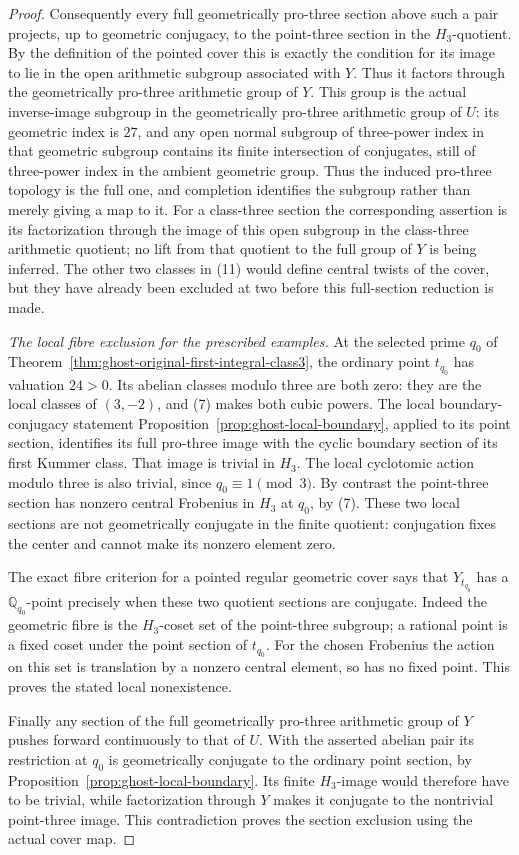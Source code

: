 \begin{proof}
Consequently every full geometrically pro-three
section above such a pair projects, up to geometric
conjugacy, to the point-three section in the
\(H_3\)-quotient. By the definition of the pointed
cover this is exactly the condition for its image
to lie in the open arithmetic subgroup associated
with \(Y\). Thus it factors through the
geometrically pro-three arithmetic group of \(Y\).
This group is the actual inverse-image subgroup in
the geometrically pro-three arithmetic group of
\(U\): its geometric index is \(27\), and any
open normal subgroup of three-power index in that
geometric subgroup contains its finite intersection
of conjugates, still of three-power index in the
ambient geometric group. Thus the induced pro-three
topology is the full one, and completion identifies
the subgroup rather than merely giving a map to it.
For a class-three section the corresponding assertion
is its factorization through the image of this open
subgroup in the class-three arithmetic quotient;
no lift from that quotient to the full group of
\(Y\) is being inferred. The other two classes
in (11) would define central twists of the cover,
but they have already been excluded at two before
this full-section reduction is made.

\emph{The local fibre exclusion for the prescribed examples.}
At the selected prime \(q_0\) of
Theorem~\ref{thm:ghost-original-first-integral-class3},
the ordinary point \(t_{q_0}\) has valuation
\(24>0\). Its abelian classes modulo three are
both zero: they are the local classes of
\((3,-2)\), and (7) makes both cubic powers.
The local boundary-conjugacy statement
Proposition~\ref{prop:ghost-local-boundary}, applied
to its point section, identifies its full pro-three
image with the cyclic boundary section of its
first Kummer class. That image is trivial in
\(H_3\). The local cyclotomic action modulo
three is also trivial, since \(q_0\equiv1\pmod3\).
By contrast the point-three section has nonzero
central Frobenius in \(H_3\) at \(q_0\), by (7).
These two local sections are not geometrically
conjugate in the finite quotient: conjugation fixes
the center and cannot make its nonzero element zero.

The exact fibre criterion for a pointed regular
geometric cover says that \(Y_{t_{q_0}}\) has a
\(\mathbb Q_{q_0}\)-point precisely when these
two quotient sections are conjugate. Indeed the
geometric fibre is the \(H_3\)-coset set of the
point-three subgroup; a rational point is a fixed
coset under the point section of \(t_{q_0}\).
For the chosen Frobenius the action on this set
is translation by a nonzero central element, so
has no fixed point. This proves the stated local
nonexistence.

Finally any section of the full geometrically
pro-three arithmetic group of \(Y\) pushes forward
continuously to that of \(U\). With the asserted
abelian pair its restriction at \(q_0\) is
geometrically conjugate to the ordinary point
section, by Proposition~\ref{prop:ghost-local-boundary}.
Its finite \(H_3\)-image would therefore have
to be trivial, while factorization through \(Y\)
makes it conjugate to the nontrivial point-three
image. This contradiction proves the section
exclusion using the actual cover map.
\end{proof}

